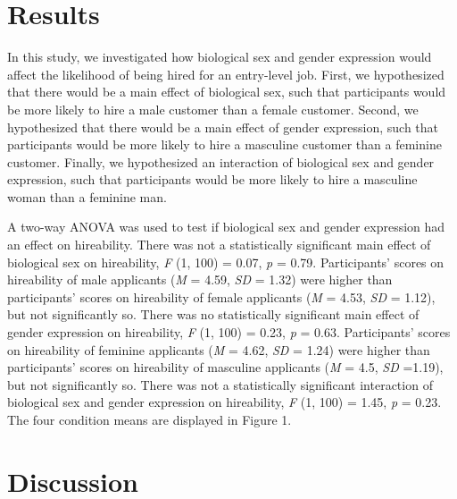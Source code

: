 \documentclass[english,man]{apa6}
\theoremstyle{definition}
\theoremstyle{definition}
\theoremstyle{remark}
\begin{document}
\section{Results}\label{results}

In this study, we investigated how biological sex and gender expression
would affect the likelihood of being hired for an entry-level job.
First, we hypothesized that there would be a main effect of biological
sex, such that participants would be more likely to hire a male customer
than a female customer. Second, we hypothesized that there would be a
main effect of gender expression, such that participants would be more
likely to hire a masculine customer than a feminine customer. Finally,
we hypothesized an interaction of biological sex and gender expression,
such that participants would be more likely to hire a masculine woman
than a feminine man.

A two-way ANOVA was used to test if biological sex and gender expression
had an effect on hireability. There was not a statistically significant
main effect of biological sex on hireability, \emph{F} (1, 100) = 0.07,
\emph{p} = 0.79. Participants' scores on hireability of male applicants
(\emph{M} = 4.59, \emph{SD} = 1.32) were higher than participants'
scores on hireability of female applicants (\emph{M} = 4.53, \emph{SD} =
1.12), but not significantly so. There was no statistically significant
main effect of gender expression on hireability, \emph{F} (1, 100) =
0.23, \emph{p} = 0.63. Participants' scores on hireability of feminine
applicants (\emph{M} = 4.62, \emph{SD} = 1.24) were higher than
participants' scores on hireability of masculine applicants (\emph{M} =
4.5, \emph{SD} =1.19), but not significantly so. There was not a
statistically significant interaction of biological sex and gender
expression on hireability, \emph{F} (1, 100) = 1.45, \emph{p} = 0.23.
The four condition means are displayed in Figure 1.

\section{Discussion}\label{discussion}
\end{document}
